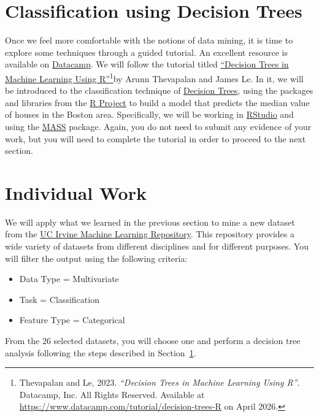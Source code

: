 \documentclass{article}
\begin{document}
\section{Classification using Decision Trees}\label{sec:tree}
Once we feel more comfortable with the notions of data mining, it is time to explore some techniques through a guided tutorial. An excellent resource is available on \href{https://www.datacamp.com/}{Datacamp}.  We will follow the tutorial titled \href{https://www.datacamp.com/tutorial/decision-trees-R}{``Decision Trees in Machine Learning Using R''}\footnote{
    Thevapalan and Le, 2023.
    \textit{``Decision Trees in Machine Learning Using R''}.
    Datacamp, Inc. All Rights Reserved.
    Available at \url{https://www.datacamp.com/tutorial/decision-trees-R} on April 2026.
}by Arunn Thevapalan and James Le. In it, we will be introduced to the classification technique of \href{https://en.wikipedia.org/wiki/Decision_tree}{Decision Trees}, using the packages and libraries from the \href{https://www.r-project.org/}{R Project} to build a model that predicts the median value of houses in the Boston area. Specifically, we will be working in \href{https://posit.co/download/rstudio-desktop/}{RStudio} and using the \href{https://cran.r-project.org/web/packages/MASS/index.html}{MASS} package. Again, you do not need to submit any evidence of your work, but you will need to complete the tutorial in order to proceed to the next section.

\section{Individual Work} \label{sec:work}
We will apply what we learned in the previous section to mine a new dataset from the \href{https://archive.ics.uci.edu/datasets}{UC Irvine Machine Learning Repository}. This repository provides a wide variety of datasets from different disciplines and for different purposes. You will filter the output using the following criteria:

\begin{itemize}
    \item Data Type = Multivariate
    \item Task = Classification
    \item Feature Type = Categorical
\end{itemize}

From the 26 selected datasets, you will choose one and perform a decision tree analysis following the steps described in Section~\ref{sec:tree}.
\end{document}
